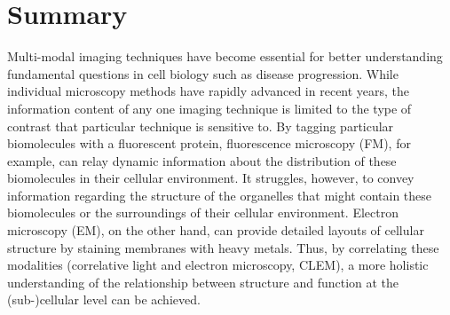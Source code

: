 \chapter*{Summary}










Multi-modal imaging techniques have become essential for better understanding fundamental questions in cell biology such as %
disease progression. While individual microscopy methods have rapidly advanced in recent years, the information content of any one imaging technique is limited to the type of contrast that particular technique is sensitive to. By tagging particular biomolecules with a fluorescent protein, fluorescence microscopy (FM), for example, can relay dynamic information about the distribution of these biomolecules in their cellular environment. It struggles, however, to convey information regarding the structure of the organelles that might contain these biomolecules or the surroundings of their cellular environment. Electron microscopy (EM), on the other hand, can provide detailed layouts of cellular structure by staining membranes with heavy metals. Thus, by correlating these modalities (correlative light and electron microscopy, CLEM), a more holistic understanding of the relationship between structure and function at the (sub-)cellular level can be achieved. 

